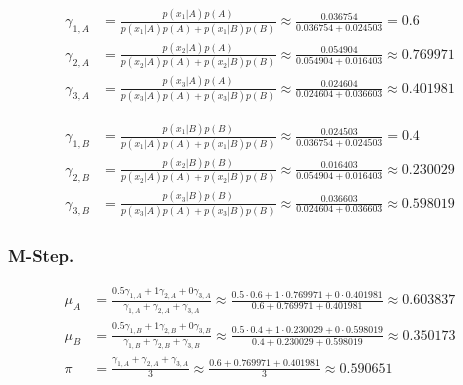 \documentclass[12pt]{article}
\begin{document}
	\begin{align*}
		\gamma_{1,A} &= \frac{p\left(x_1 \vert A\right) p\left(A\right)}
		{p\left(x_1 \vert A\right) p\left(A\right)
		+ p\left(x_1 \vert B\right) p\left(B\right)}
		\approx \frac{0.036754}{0.036754+0.024503} = 0.6 \\
		\gamma_{2,A} &= \frac{p\left(x_2 \vert A\right) p\left(A\right)}
		{p\left(x_2 \vert A\right) p\left(A\right)
		+ p\left(x_2 \vert B\right) p\left(B\right)}
		\approx \frac{0.054904}{0.054904+0.016403} \approx 0.769971 \\
		\gamma_{3,A} &= \frac{p\left(x_3 \vert A\right) p\left(A\right)}
		{p\left(x_3 \vert A\right) p\left(A\right)
		+ p\left(x_3 \vert B\right) p\left(B\right)}
		\approx \frac{0.024604}{0.024604+0.036603} \approx 0.401981
	\end{align*}

	\begin{align*}
		\gamma_{1,B} &= \frac{p\left(x_1 \vert B\right) p\left(B\right)}
		{p\left(x_1 \vert A\right) p\left(A\right)
		+ p\left(x_1 \vert B\right) p\left(B\right)}
		\approx \frac{0.024503}{0.036754+0.024503} = 0.4 \\
		\gamma_{2,B} &= \frac{p\left(x_2 \vert B\right) p\left(B\right)}
		{p\left(x_2 \vert A\right) p\left(A\right)
		+ p\left(x_2 \vert B\right) p\left(B\right)}
		\approx \frac{0.016403}{0.054904+0.016403} \approx 0.230029 \\
		\gamma_{3,B} &= \frac{p\left(x_3 \vert B\right) p\left(B\right)}
		{p\left(x_3 \vert A\right) p\left(A\right)
		+ p\left(x_3 \vert B\right) p\left(B\right)}
		\approx \frac{0.036603}{0.024604+0.036603} \approx 0.598019
	\end{align*}

	\subsubsection*{M-Step.}
	
	\begin{align*}
		\mu_A &= \frac{0.5\gamma_{1,A}+1\gamma_{2,A}+0\gamma_{3,A}}{\gamma_{1,A}+\gamma_{2,A}+\gamma_{3,A}}
		\approx \frac{0.5 \cdot 0.6+1\cdot 0.769971+0\cdot 0.401981}{0.6+0.769971+0.401981} \approx 0.603837 \\
		\mu_B &= \frac{0.5\gamma_{1,B}+1\gamma_{2,B}+0\gamma_{3,B}}{\gamma_{1,B}+\gamma_{2,B}+\gamma_{3,B}}
		\approx \frac{0.5 \cdot 0.4 + 1 \cdot 0.230029 + 0 \cdot 0.598019}{0.4 + 0.230029 + 0.598019} \approx 0.350173 \\
		\pi &= \frac{\gamma_{1,A}+\gamma_{2,A}+\gamma_{3,A}}{3} \approx \frac{0.6+0.769971+0.401981}{3} \approx 0.590651
	\end{align*}
\end{document}
